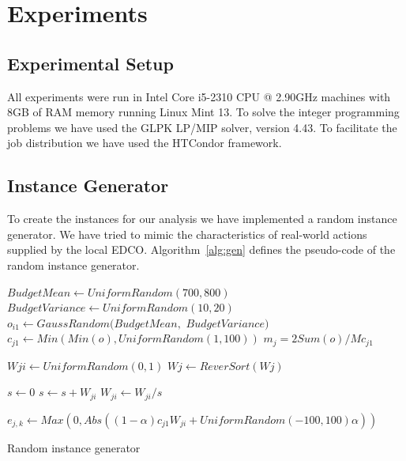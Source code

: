 \section{Experiments}
\label{sec:exp}

\subsection{Experimental Setup}
All experiments were run in Intel Core i5-2310 CPU @ 2.90GHz machines
with 8GB of RAM memory running Linux Mint 13. To solve the integer 
programming problems we have used the GLPK LP/MIP solver,
version 4.43. To facilitate the job distribution we have used the HTCondor framework.

\subsection{Instance Generator}
To create the instances for our analysis we have implemented a random instance generator.
We have tried to mimic the characteristics of real-world actions supplied by the local EDCO.
Algorithm~\ref{alg:gen} defines the pseudo-code of the random instance generator.

\begin{algorithm}[H]
\begin{algorithmic}[1]
\State \label{line:gen1} $BudgetMean \gets UniformRandom(700,800)$
\State $BudgetVariance \gets UniformRandom(10,20)$
  \State $o_{i1} \gets GaussRandom(BudgetMean,$ $BudgetVariance)$
\EndFor \label{line:gen2}
\label{line:gen3}
  \State $c_{j1} \gets \label{line:min} Min(Min(o), UniformRandom(1,100))$
\EndFor
{}
  \State \label{line:market} $ m_j = 2 Sum(o) / M c_{j1}$
\EndFor \label{line:gen4}

 \label{line:W1}
    \State $W{ji} \gets UniformRandom(0,1)$
  \EndFor
  \State $W{j} \gets ReverSort(W{j})$
\EndFor

  \State $s \gets 0$
    \State $s \gets s + W_{ji}$
  \EndFor
    \State $W_{ji} \gets W_{ji}/s$
  \EndFor
\EndFor  \label{line:W2}

 \label{line:e1}
      \State \label{line:en} $e_{j,k} \gets Max(0, Abs((1-\alpha)c_{j1} W_{ji} + UniformRandom(-100,100)\alpha))$
  \EndFor
\EndFor \label{line:e2}
\EndFunction
\end{algorithmic}
\caption{Random instance generator}
\label{alg:gen}
\end{algorithm}

